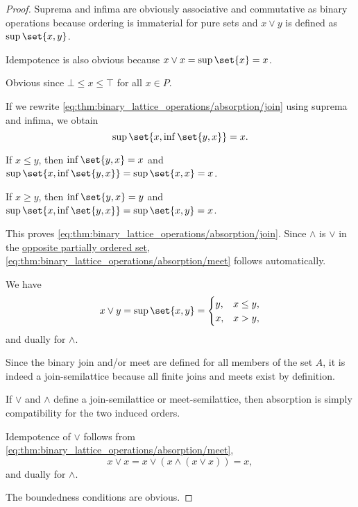\begin{proof}
   Suprema and infima are obviously associative and commutative as binary operations because ordering is immaterial for pure sets and \( x \vee y \) is defined as \( \sup\set{ x, y } \).

  Idempotence is also obvious because \( x \vee x = \sup\set{ x } = x \).

   Obvious since \( \bot \leq x \leq \top \) for all \( x \in P \).

   If we rewrite \eqref{eq:thm:binary_lattice_operations/absorption/join} using suprema and infima, we obtain
  \begin{equation*}
    \sup\set{ x, \inf\set{ y, x } } = x.
  \end{equation*}

  If \( x \leq y \), then \( \inf\set{ y, x } = x \) and \( \sup\set{ x, \inf\set{ y, x } } = \sup\set{ x, x } = x \).

  If \( x \geq y \), then \( \inf\set{ y, x } = y \) and \( \sup\set{ x, \inf\set{ y, x } } = \sup\set{ x, y } = x \).

  This proves \eqref{eq:thm:binary_lattice_operations/absorption/join}. Since \( \wedge \) is \( \vee \) in the \hyperref[thm:preorder_duality]{opposite partially ordered set}, \eqref{eq:thm:binary_lattice_operations/absorption/meet} follows automatically.

   We have
  \begin{equation*}
    x \vee y
    =
    \sup\set{ x, y }
    =
    \begin{cases}
      y, &x \leq y, \\
      x, &x > y,
    \end{cases}
  \end{equation*}
  and dually for \( \wedge \).

   Since the binary join and/or meet are defined for all members of the set \( A \), it is indeed a join-semilattice because all finite joins and meets exist by definition.

   If \( \vee \) and \( \wedge \) define a join-semilattice or meet-semilattice, then absorption is simply compatibility for the two induced orders.

  Idempotence of \( \vee \) follows from \eqref{eq:thm:binary_lattice_operations/absorption/meet},
  \begin{equation*}
    x \vee x = x \vee (x \wedge (x \vee x)) = x,
  \end{equation*}
  and dually for \( \wedge \).

  The boundedness conditions are obvious.
\end{proof}

